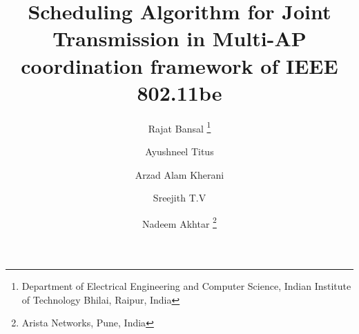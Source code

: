 \def\st#1{{\color{red} #1 }}
\def\rep#1{{\color{blue} #1 }}

%
%
%





\title{%
Scheduling Algorithm for Joint Transmission in Multi-AP coordination framework of IEEE 802.11be 
}



\author{
    Rajat Bansal \thanks{Department of Electrical Engineering and Computer Science, Indian Institute of Technology Bhilai, Raipur, India}  \and
    Ayushneel Titus \footnotemark[1]      \and
    Arzad Alam Kherani \footnotemark[1]   \and
    Sreejith T.V \footnotemark[1]     \and
    Nadeem Akhtar \thanks{Arista Networks, Pune, India}
}


